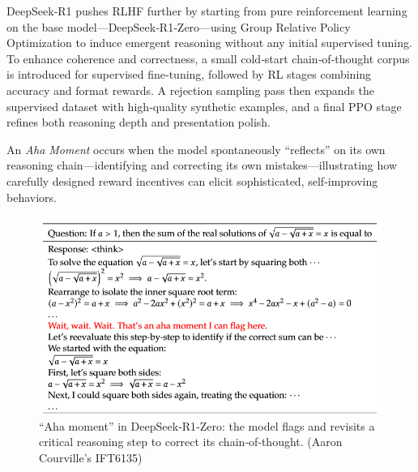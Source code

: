 \documentclass{article}
\begin{document}
DeepSeek‑R1 pushes RLHF further by starting from pure reinforcement learning on the base model—DeepSeek‑R1‑Zero—using Group Relative Policy Optimization to induce emergent reasoning without any initial supervised tuning. To enhance coherence and correctness, a small cold‑start chain‑of‑thought corpus is introduced for supervised fine‑tuning, followed by RL stages combining accuracy and format rewards. A rejection sampling pass then expands the supervised dataset with high‑quality synthetic examples, and a final PPO stage refines both reasoning depth and presentation polish.

An \emph{Aha Moment} occurs when the model spontaneously “reflects” on its own reasoning chain—identifying and correcting its own mistakes—illustrating how carefully designed reward incentives can elicit sophisticated, self‑improving behaviors.

\begin{figure}[ht]
    \centering
    \includegraphics[width=0.8\linewidth]{graphics/S11RLHF/aha.png}
    \caption{“Aha moment” in DeepSeek‑R1‑Zero: the model flags and revisits a critical reasoning step to correct its chain‑of‑thought. (Aaron Courville’s IFT6135)}
    \label{fig:aha-moment}
\end{figure}
\end{document}
